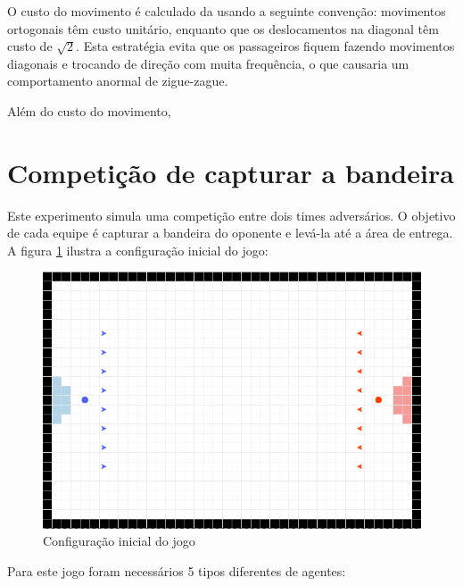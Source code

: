 \documentclass[preprint,12pt]{elsarticle}
\begin{document}
O custo do movimento é calculado da usando a seguinte convenção: movimentos ortogonais têm custo unitário, enquanto que os deslocamentos na diagonal têm custo de $\sqrt{2}$. Esta estratégia evita que os passageiros fiquem fazendo movimentos diagonais e trocando de direção com muita frequência, o que causaria um comportamento anormal de zigue-zague.

Além do custo do movimento, 

\section{Competição de capturar a bandeira}
\label{sec:sim2}

Este experimento simula uma competição entre dois times adversários. O objetivo de cada equipe é capturar a bandeira do oponente e levá-la até a área de entrega. A figura \ref{fig:flag-ini} ilustra a configuração inicial do jogo:

\begin{figure}[H]
	\centering
	\includegraphics[totalheight=5cm]{figures/flag-ini.png}
	\caption{Configuração inicial do jogo}
	\label{fig:flag-ini}
\end{figure}

Para este jogo foram necessários 5 tipos diferentes de agentes:
\end{document}
